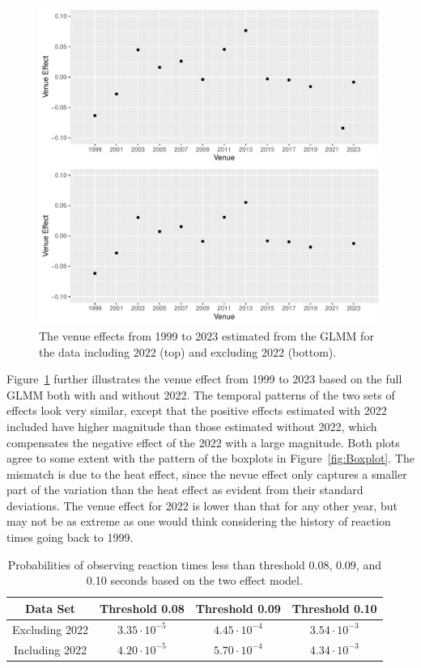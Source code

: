 \documentclass[12pt, letterpaper, titlepage]{article}
\begin{document}
\begin{figure}[tbp]
  \centering
  \includegraphics{ComparisonOfVenueEffects}
  \caption{The venue effects from 1999 to 2023 estimated from the GLMM for the
    data including 2022 (top) and excluding 2022 (bottom).}
  \label{fig:VenueEffects}
\end{figure}


Figure~\ref{fig:VenueEffects} further illustrates the venue effect from 1999 to
2023 based on the full GLMM both with and without 2022.  The temporal patterns
of the two sets of effects look very similar, except that the positive effects
estimated with 2022 included have higher magnitude than those estimated without
2022, which compensates the negative effect of the 2022 with a large magnitude.
Both plots agree to some extent with the pattern of the boxplots in
Figure~\ref{fig:Boxplot}. The mismatch is due to the heat effect, since the nevue
effect only captures a smaller part of the variation than the heat effect as
evident from their standard deviations. The venue effect for 2022 is
lower than that for any other year, but may not be as extreme as one would
think considering the history of reaction times going back to 1999.


\begin{table}
  \centering
  \caption{Probabilities of observing reaction times less than threshold 0.08,
  0.09, and 0.10 seconds based on the two effect model.}
  \begin{tabular}{c c c c} 
   \toprule
   Data Set & Threshold 0.08 & Threshold 0.09 & Threshold 0.10  \\ 
   \midrule
   Excluding 2022 & $3.35\cdot10^{-5}$ & $4.45\cdot10^{-4}$ &  $3.54\cdot10^{-3}$  \\ 
   Including 2022 & $4.20\cdot10^{-5}$ & $5.70\cdot10^{-4}$ & $4.34\cdot10^{-3}$ \\
   \bottomrule
  \end{tabular}
  \label{tab:Sim_probability}
\end{table}
\end{document}
